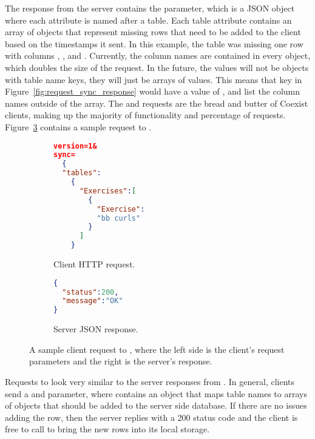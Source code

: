 The response from the server contains the  parameter, which is a
JSON object where each attribute is named after a table. Each table attribute
contains an array of objects that represent missing rows that need to be added
to the client based on the timestamps it sent. In this example, the
 table was missing one row with columns ,
, and . Currently, the column names are contained in
every object, which doubles the size of the request. In the future, the values
will not be objects with table name keys, they will just be arrays of values.
This means that  key in Figure~\ref{fig:request_sync_response}
would have a value of \var{[["bb curls","2013-04-21 04:32:18","0"]]}, and list
the column names outside of the array. The \sync and \create requests are the
bread and butter of Coexist clients, making up the majority of functionality and
percentage of requests. Figure~\ref{fig:request_create} contains a sample
request to \create.

\begin{figure}[h!]
\begin{subfigure}[b]{0.23\textwidth}
\begin{lstlisting}[language=json]
version=1&
sync=
  {
  "tables":
    {
      "Exercises":[
        {
          "Exercise":
          "bb curls"
        }
      ]
    }
\end{lstlisting}
\caption{Client HTTP request.}
\label{fig:gull}
\end{subfigure}%
\begin{subfigure}[b]{0.27\textwidth}
\begin{lstlisting}[language=json]
{
  "status":200,
  "message":"OK"
}
\end{lstlisting}
\caption{Server JSON response.}
\label{fig:tiger}
\end{subfigure}
\caption{A sample client request to \create, where the left side is the client's
request parameters and the right is the server's response.}
\label{fig:request_create} 
\end{figure}


Requests to \create look very similar to the server responses from \sync. In
general, clients send a  and  parameter, where 
contains an object that maps table names to arrays of objects that should be added
to the server side database. If there are no issues adding the row, then the
server replies with a 200 status code and the client is free to call \sync to
bring the new rows into its local storage.

